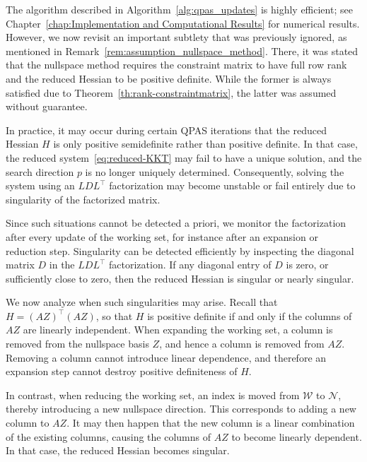 \documentclass{book}
\theoremstyle{definition}
\newcounter{algorithm_}
\numberwithin{algorithm_}{chapter}
\begin{document}
{The algorithm described in Algorithm~\ref{alg:qpas_updates} is highly efficient; see Chapter~\ref{chap:Implementation and Computational Results} for numerical results. However, we now revisit an important subtlety that was previously ignored, as mentioned in Remark~\ref{rem:assumption_nullspace_method}. There, it was stated that the nullspace method requires the constraint matrix to have full row rank and the reduced Hessian to be positive definite. While the former is always satisfied due to Theorem~\ref{th:rank-constraintmatrix}, the latter was assumed without guarantee.

In practice, it may occur during certain QPAS iterations that the reduced Hessian \(H\) is only positive semidefinite rather than positive definite. In that case, the reduced system~\eqref{eq:reduced-KKT} may fail to have a unique solution, and the search direction \(p\) is no longer uniquely determined. Consequently, solving the system using an \(LDL^\top\) factorization may become unstable or fail entirely due to singularity of the factorized matrix.

\bigskip

Since such situations cannot be detected a priori, we monitor the factorization after every update of the working set, for instance after an expansion or reduction step. Singularity can be detected efficiently by inspecting the diagonal matrix \(D\) in the \(LDL^\top\) factorization. If any diagonal entry of \(D\) is zero, or sufficiently close to zero, then the reduced Hessian is singular or nearly singular.

\bigskip

We now analyze when such singularities may arise. Recall that $H = (AZ)^\top (AZ)$,
so that \(H\) is positive definite if and only if the columns of \(AZ\) are linearly independent.
When expanding the working set, a column is removed from the nullspace basis \(Z\), and hence a column is removed from \(AZ\). Removing a column cannot introduce linear dependence, and therefore an expansion step cannot destroy positive definiteness of \(H\).

In contrast, when reducing the working set, an index is moved from \(\mathcal{W}\) to \(\mathcal{N}\), thereby introducing a new nullspace direction. This corresponds to adding a new column to \(AZ\). It may then happen that the new column is a linear combination of the existing columns, causing the columns of \(AZ\) to become linearly dependent. In that case, the reduced Hessian becomes singular.

\bigskip

}
\end{document}

